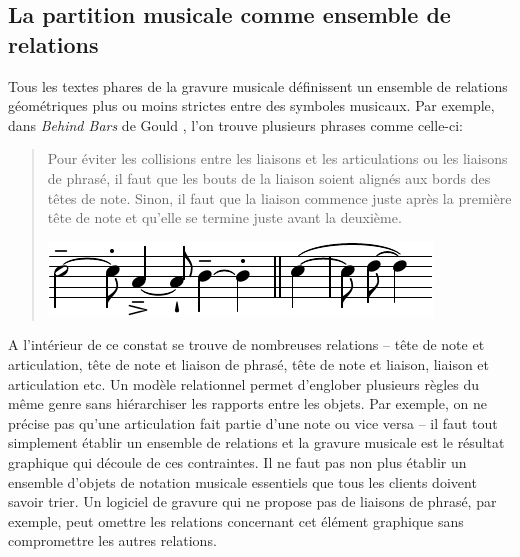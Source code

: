 \documentclass{article}
\begin{document}
\subsection{La partition musicale comme ensemble de relations}
Tous les textes phares de la gravure musicale définissent un ensemble de relations
géométriques plus ou moins strictes entre des symboles musicaux. Par
exemple, dans \emph{Behind Bars} de Gould \cite{Gould11}, l'on trouve
plusieurs phrases comme celle-ci:
\begin{quote}
Pour éviter les collisions entre les liaisons et les articulations ou les
liaisons de phrasé, il faut que les bouts de la liaison soient alignés aux
bords des têtes de note. Sinon, il faut que la liaison commence juste
après la première tête de note et qu'elle se termine juste avant la deuxième.
\cite[p.62]{Gould11}\\
\begin{center}
\includegraphics{gould_preview.pdf}
\end{center}
\end{quote}
A l'intérieur de ce constat se trouve de nombreuses relations -- tête de
note et articulation, tête de note et liaison de phrasé, tête de note et
liaison, liaison et articulation etc. Un modèle relationnel permet d'englober
plusieurs règles du même genre sans hiérarchiser les rapports entre les
objets. Par exemple, on ne précise pas qu'une articulation fait partie d'une note ou vice
versa -- il faut tout simplement établir un ensemble de relations et la gravure
musicale est le résultat graphique qui découle de ces contraintes. Il ne
faut pas non plus établir un ensemble d'objets de notation musicale
\og{}essentiels\fg{} que tous les clients doivent savoir trier.
Un logiciel de gravure qui ne propose pas de liaisons de phrasé, par
exemple, peut omettre
les relations concernant cet élément graphique sans compromettre les autres
relations.\par
\end{document}
